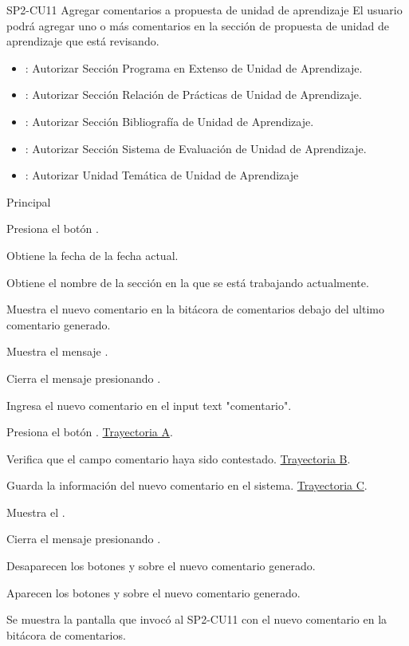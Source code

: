 \begin{UseCase}{SP2-CU11}{ Agregar comentarios a propuesta de unidad de aprendizaje }{El usuario podrá agregar uno o más comentarios en la sección de propuesta de unidad de aprendizaje que está revisando.}
{\begin{itemize}
            \item {}: Autorizar Sección Programa en Extenso de Unidad de Aprendizaje.
            \item {}: Autorizar Sección Relación de Prácticas de Unidad de Aprendizaje.
            \item {}: Autorizar Sección Bibliografía de Unidad de Aprendizaje.
            \item {}: Autorizar Sección Sistema de Evaluación de Unidad de Aprendizaje.
            \item {}: Autorizar Unidad Temática de Unidad de Aprendizaje

        \end{itemize}
    }
\end{UseCase}

\begin{UCtrayectoria}{Principal}

    \UCpaso[\UCactor] Presiona el botón . 
    
    \UCpaso Obtiene la fecha de la fecha actual. 
    
    \UCpaso Obtiene el nombre de la sección en la que se está trabajando actualmente.
    
    \UCpaso Muestra el nuevo comentario en la bitácora de comentarios debajo del ultimo comentario generado.
    
    \UCpaso Muestra el mensaje .

    \UCpaso[\UCactor] Cierra el mensaje presionando .
    
    \UCpaso[\UCactor] Ingresa el nuevo comentario en el input text "comentario".
    
    \UCpaso[\UCactor] Presiona el botón . \hyperlink{SP2-CU11-A}{Trayectoria A}.
    
    \UCpaso Verifica que el campo comentario haya sido contestado. \hyperlink{SP2-CU11-B}{Trayectoria B}.

    \UCpaso Guarda la información del nuevo comentario en el sistema. \hyperlink{SP2-CU11-C}{Trayectoria C}.

    \UCpaso Muestra el  .

    \UCpaso[\UCactor] Cierra el mensaje presionando .

    \UCpaso Desaparecen los botones   y   sobre el nuevo comentario generado.

    \UCpaso Aparecen los botones   y   sobre el nuevo comentario generado.

    \UCpaso Se muestra la pantalla que invocó al SP2-CU11 con el nuevo comentario en la bitácora de comentarios. 

\end{UCtrayectoria}


